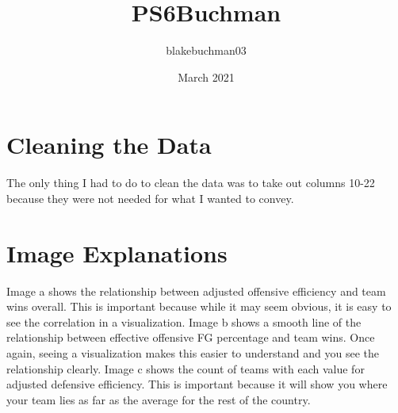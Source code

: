 \documentclass{article}
\title{PS6Buchman}
\author{blakebuchman03 }
\date{March 2021}
\begin{document}
\maketitle

\section{Cleaning the Data}
The only thing I had to do to clean the data was to take out columns 10-22 because they were not needed for what I wanted to convey. 
\section{Image Explanations}
Image a shows the relationship between adjusted offensive efficiency and team wins overall. This is important because while it may seem obvious, it is easy to see the correlation in a visualization. 
\newline
\newline Image b shows a smooth line of the relationship between effective offensive FG percentage and team wins. Once again, seeing a visualization makes this easier to understand and you see the relationship clearly. 
\newline
\newline Image c shows the count of teams with each value for adjusted defensive efficiency. This is important because it will show you where your team lies as far as the average for the rest of the country.
\end{document}

